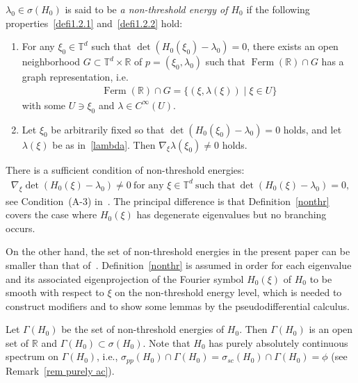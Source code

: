 \documentclass[10pt,a4paper]{amsart}
\renewcommand{\l}{\lambda}
\newcommand{\x}{\xi}
\newcommand{\s}{\sigma}
\newcommand{\R}{\mathbb{R}}
\newcommand{\T}{\mathbb{T}}
\DeclareMathOperator{\Ferm}{Ferm}
\begin{document}
\begin{defi}\label{nonthr}
$\l_0\in\s(H_0)$ is said to be \emph{a non-threshold energy of $H_0$} if the following properties~\eqref{defi1.2.1} and~\eqref{defi1.2.2} hold:
\begin{enumerate}
\item\label{defi1.2.1} For any $\x_0\in\T^d$ such that $\det(H_0(\x_0)-\l_0)=0$, there exists an open neighborhood $G \subset \T^d \times \R$ of $p=(\x_0,\l_0)$ such that $\Ferm(\R) \cap G$ has a graph representation, i.e.
\begin{align}\label{lambda}
\Ferm(\R) \cap G = \{(\x,\l(\x)) \mid \x\in U \}
\end{align}
with some $U\ni \x_0$ and $\l\in C^\infty(U)$.

\item\label{defi1.2.2} Let $\x_0$ be arbitrarily fixed so that $\det(H_0(\x_0)-\l_0)=0$ holds, and let $\l(\x)$ be as in~\eqref{lambda}. Then $\nabla_\x \l(\x_0) \neq 0$ holds.
\end{enumerate}
\end{defi}

\begin{rema}
There is a sufficient condition of non-threshold energies:
\begin{align*}
\nabla_\x \det(H_0(\x)-\l_0)\neq0 \ \text{for any } \x\in\T^d \ \text{such that} \ \det(H_0(\x)-\l_0)=0,
\end{align*}
see Condition~(A-3) in~\cite[Sections~6~and~7]{An-I-M}. The principal difference is that Definition~\ref{nonthr} covers the case where $H_0(\x)$ has degenerate eigenvalues but no branching occurs.

On the other hand, the set of non-threshold energies in the present paper can be smaller than that of~\cite[Definition~5.5]{P-R}. Definition~\ref{nonthr} is assumed in order for each eigenvalue and its associated eigenprojection of the Fourier symbol $H_0(\x)$ of $H_0$ to be smooth with respect to $\x$ on the non-threshold energy level, which is needed to construct modifiers and to show some lemmas by the pseudodifferential calculus.
\end{rema}

Let $\Gamma(H_0)$ be the set of non-threshold energies of $H_0$. Then $\Gamma(H_0)$ is an open set of $\R$ and $\Gamma(H_0) \subset \s(H_0)$. Note that $H_0$ has purely absolutely continuous spectrum on $\Gamma(H_0)$, i.e., $\s_{pp}(H_0)\cap \Gamma(H_0)=\s_{sc}(H_0)\cap \Gamma(H_0)=\phi$ (see Remark~\ref{rem purely ac}).
\end{document}
